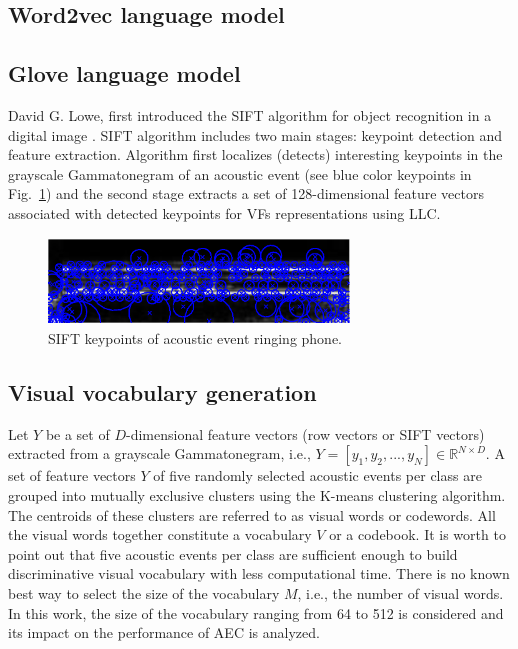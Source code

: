 \documentclass[a4paper]{article}
\begin{document}
\subsection{Word2vec language model}
\subsection{Glove language model}




















David G. Lowe, first introduced the SIFT algorithm for object recognition in a digital image \cite{lowe2004distinctive}. SIFT algorithm includes two main stages: keypoint detection and feature extraction. Algorithm first localizes (detects) interesting keypoints in the grayscale Gammatonegram of an acoustic event (see blue color keypoints in Fig.~\ref{fig2}) and the second stage extracts a set of 128-dimensional feature vectors associated with detected keypoints for VFs representations using LLC. 
\begin{figure}[!t]
	
	\centerline{\includegraphics[width=8cm,height=2.3cm]{g34}}
	
	\caption{SIFT keypoints of acoustic event ringing phone.}
	\label{fig2}
\end{figure}
\subsection{Visual vocabulary generation}
Let $Y$ be a set of $D$-dimensional feature vectors (row vectors or SIFT vectors) extracted from a grayscale Gammatonegram, i.e., $Y=[y_1,  y_2,...,y_N] \in \mathbb{R}^{N\times D}$.  A set of feature vectors $Y$ of five randomly selected acoustic events per class are grouped into mutually exclusive clusters using the K-means clustering algorithm.  The centroids of these clusters are referred to as visual words or codewords.  All the visual words together constitute a
vocabulary $V$ or a codebook. It is worth to point out that five acoustic events per class are sufficient enough to build discriminative visual vocabulary with less computational time. There is no known best way to select
the size of the vocabulary $M$, i.e., the number of visual words. In
this work, the size of the vocabulary ranging from 64 to 512
is considered and its impact on the performance of AEC is
analyzed.
\end{document}
